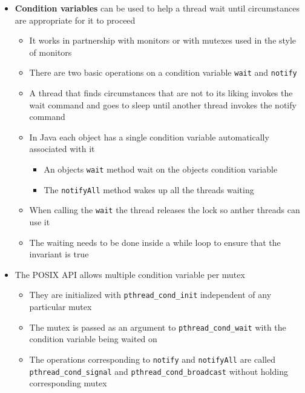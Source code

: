 \documentclass[11pt]{article}
\providecommand{\tightlist}{%
      \setlength{\itemsep}{0pt}\setlength{\parskip}{0pt}}
\begin{document}
\begin{itemize}
\tightlist
\item
  \textbf{Condition variables} can be used to help a thread wait until
  circumstances are appropriate for it to proceed

  \begin{itemize}
  \tightlist
  \item
    It works in partnership with monitors or with mutexes used in the
    style of monitors
  \item
    There are two basic operations on a condition variable \texttt{wait}
    and \texttt{notify}
  \item
    A thread that finds circumstances that are not to its liking invokes
    the wait command and goes to sleep until another thread invokes the
    notify command
  \item
    In Java each object has a single condition variable automatically
    associated with it

    \begin{itemize}
    \tightlist
    \item
      An objects \texttt{wait} method wait on the objects condition
      variable
    \item
      The \texttt{notifyAll} method wakes up all the threads waiting
    \end{itemize}
  \item
    When calling the \texttt{wait} the thread releases the lock so
    anther threads can use it
  \item
    The waiting needs to be done inside a while loop to ensure that the
    invariant is true
  \end{itemize}
\item
  The POSIX API allows multiple condition variable per mutex

  \begin{itemize}
  \tightlist
  \item
    They are initialized with \texttt{pthread\_cond\_init} independent
    of any particular mutex
  \item
    The mutex is passed as an argument to \texttt{pthread\_cond\_wait}
    with the condition variable being waited on
  \item
    The operations corresponding to \texttt{notify} and
    \texttt{notifyAll} are called \texttt{pthread\_cond\_signal} and
    \texttt{pthread\_cond\_broadcast} without holding corresponding
    mutex
  \end{itemize}
\end{itemize}
\end{document}
